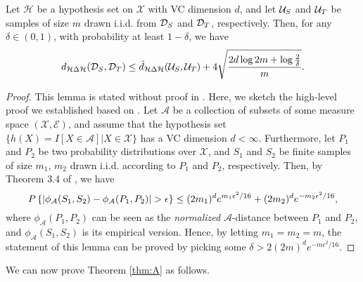 \begin{lemma}\label{lem:unif_conv_h}
  Let $\mathcal{H}$ be a hypothesis set on $\mathcal{X}$ with VC dimension $d$, and let $\mathcal{U}_S$ and $\mathcal{U}_T$ be samples of size $m$ drawn i.i.d. from $\mathcal{D}_S$ and $\mathcal{D}_T$, respectively. Then, for any $\delta \in (0,1)$, with probability at least $1-\delta$, we have
  \begin{equation}\label{eq:unif_conv_h}
    d_{\mathcal{H} \Delta \mathcal{H}}(\mathcal{D}_S, \mathcal{D}_T)
    \leq
    \hat{d}_{\mathcal{H} \Delta \mathcal{H}}(\mathcal{U}_S, \mathcal{U}_T)
    +
    4 \sqrt{\frac{2d \log{2m} + \log{\frac{2}{\delta}}}{m}}.
  \end{equation}
\end{lemma}
\begin{proof}
  This lemma is stated without proof in \cite{BenDavid2010}. Here, we sketch the high-level proof we established based on \cite{Kifer2004}. Let $\mathcal{A}$ be a collection of subsets of some measure space $(\mathcal{X}, \mathcal{E})$, and assume that the hypothesis set $\{ h(X)=I[X \in \mathcal{A}] \vert X \in \mathcal{X} \}$ has a VC dimension $d < \infty$. Furthermore, let $P_1$ and $P_2$ be two probability distributions over $\mathcal{X}$, and $S_1$ and $S_2$ be finite samples of size $m_1$, $m_2$ drawn i.i.d. according to $P_1$ and $P_2$, respectively. Then, by Theorem 3.4 of \cite{Kifer2004}, we have
  \begin{equation}
    P\left\{ \left \lvert  \phi_{\mathcal{A}}(S_1, S_2) - \phi_{\mathcal{A}}(P_1, P_2) \right \rvert > \epsilon \right \} \leq (2m_1)^d e^{m_1 \epsilon^2 / 16} + (2 m_2)^d e^{-m_2 \epsilon^2 / 16},
  \end{equation}
  where $\phi_{\mathcal{A}}(P_1, P_2)$ can be seen as the \textit{normalized} $\mathcal{A}$-distance between $P_1$ and $P_2$, and $\phi_{\mathcal{A}}(S_1, S_2)$ is its empirical version. Hence, by letting $m_1 = m_2 = m$, the statement of this lemma can be proved by picking some $\delta > 2 (2m)^d e^{-m \epsilon^2 / 16}$.

\end{proof}

We can now prove Theorem \ref{thm:A} as follows.

